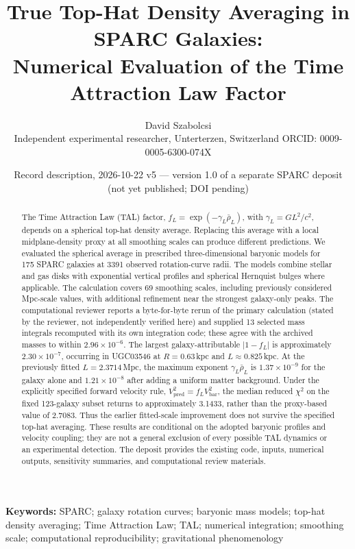 \documentclass[10pt,a4paper]{article}
\title{True Top-Hat Density Averaging in SPARC Galaxies:\\ Numerical Evaluation of the Time Attraction Law Factor}
\author{David Szabolcsi\\ \small Independent experimental researcher, Unterterzen, Switzerland \quad ORCID: 0009-0005-6300-074X}
\date{Record description, 2026-10-22 v5 --- version 1.0 of a separate SPARC deposit (not yet published; DOI pending)}
\begin{document}
\maketitle

\begin{abstract}\noindent
The Time Attraction Law (TAL) factor, $f_L=\exp(-\gamma_L\bar\rho_L)$, with $\gamma_L=GL^2/c^2$, depends on a spherical top-hat density average. Replacing this average with a local midplane-density proxy at all smoothing scales can produce different predictions. We evaluated the spherical average in prescribed three-dimensional baryonic models for 175 SPARC galaxies at 3391 observed rotation-curve radii. The models combine stellar and gas disks with exponential vertical profiles and spherical Hernquist bulges where applicable. The calculation covers 69 smoothing scales, including previously considered Mpc-scale values, with additional refinement near the strongest galaxy-only peaks. The computational reviewer reports a byte-for-byte rerun of the primary calculation (stated by the reviewer, not independently verified here) and supplied 13 selected mass integrals recomputed with its own integration code; these agree with the archived masses to within $2.96\times10^{-6}$. The largest galaxy-attributable $|1-f_L|$ is approximately $2.30\times10^{-7}$, occurring in UGC03546 at $R=0.63$\,kpc and $L\approx0.825$\,kpc. At the previously fitted $L=2.3714$\,Mpc, the maximum exponent $\gamma_L\bar\rho_L$ is $1.37\times10^{-9}$ for the galaxy alone and $1.21\times10^{-8}$ after adding a uniform matter background. Under the explicitly specified forward velocity rule, $V_\mathrm{pred}^2=f_L V_\mathrm{bar}^2$, the median reduced $\chi^2$ on the fixed 123-galaxy subset returns to approximately 3.1433, rather than the proxy-based value of 2.7083. Thus the earlier fitted-scale improvement does not survive the specified top-hat averaging. These results are conditional on the adopted baryonic profiles and velocity coupling; they are not a general exclusion of every possible TAL dynamics or an experimental detection. The deposit provides the existing code, inputs, numerical outputs, sensitivity summaries, and computational review materials.
\end{abstract}

\noindent\textbf{Keywords:} SPARC; galaxy rotation curves; baryonic mass models; top-hat density averaging; Time Attraction Law; TAL; numerical integration; smoothing scale; computational reproducibility; gravitational phenomenology
\end{document}
